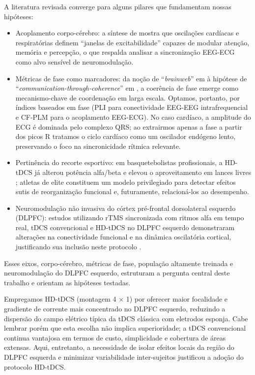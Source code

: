 A literatura revisada converge para alguns pilares que fundamentam nossas hipóteses:
\begin{itemize}
    \item Acoplamento corpo-cérebro: a síntese de  mostra que oscilações cardíacas e respiratórias definem ``janelas de excitabilidade'' capazes de modular atenção, memória e percepção, o que respalda analisar a sincronização EEG-ECG como alvo sensível de neuromodulação.
    \item Métricas de fase como marcadores: da noção de ``\textit{brainweb}'' em  à hipótese de ``\textit{communication-through-coherence}'' em , a coerência de fase emerge como mecanismo-chave de coordenação em larga escala. Optamos, portanto, por índices baseados em fase (PLI para conectividade EEG-EEG intrafrequencial e CF-PLM para o acoplamento EEG-ECG). No caso cardíaco, a amplitude do ECG é dominada pelo complexo QRS; ao extrairmos apenas a fase a partir dos picos R tratamos o ciclo cardíaco como um oscilador endógeno lento, preservando o foco na sincronicidade rítmica relevante.
    \item Pertinência do recorte esportivo: em basquetebolistas profissionais, a HD-tDCS já alterou potência alfa/beta e elevou o aproveitamento em lances livres \cite{moscaleski2022hdtdcs}; atletas de elite constituem um modelo privilegiado para detectar efeitos sutis de reorganização funcional e, futuramente, relacioná-los ao desempenho.
    \item Neuromodulação não invasiva do córtex pré-frontal dorsolateral esquerdo (DLPFC): estudos utilizando rTMS sincronizada com ritmos alfa em tempo real, tDCS convencional e HD-tDCS no DLPFC esquerdo demonstraram alterações na conectividade funcional e na dinâmica oscilatória cortical, justificando sua inclusão neste protocolo \cite{zrenner2020brain,wu2019efficiency,han2022functional,arif2021high}.
\end{itemize}

Esses eixos, corpo-cérebro, métricas de fase, população altamente treinada e neuromodulação do DLPFC esquerdo, estruturam a pergunta central deste trabalho e orientam as hipóteses testadas.

Empregamos HD-tDCS (montagem 4 × 1) por oferecer maior focalidade e gradiente de corrente mais concentrado no DLPFC esquerdo, reduzindo a dispersão do campo elétrico típica da tDCS clássica com eletrodos esponja. Cabe lembrar porém que esta escolha não implica superioridade; a tDCS convencional continua vantajosa em termos de custo, simplicidade e cobertura de áreas extensas. Aqui, entretanto, a necessidade de isolar efeitos locais da região do DLPFC esquerda e minimizar variabilidade inter-sujeitos justificou a adoção do protocolo HD-tDCS.

